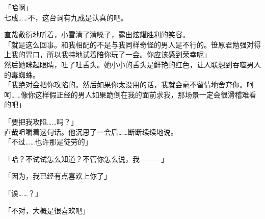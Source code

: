 「哈啊」\\

七成……不，这台词有九成是认真的吧。

直哉敷衍地听着，小雪清了清嗓子，露出炫耀胜利的笑容。\\

「就是这么回事。和我相配的不是与我同样奇怪的男人是不行的。笹原君勉强对得上我的胃口，所以我特地试着陪你玩了一会。你应该感到荣幸呢」\\

然后她眯起眼睛，吐了吐舌头。她小小的舌头是鲜艳的红色，让人联想到吞噬男人的毒蜘蛛。\\

「我绝对会把你攻陷的。然后如果你太没用的话，我就会毫不留情地舍弃你。呵呵……像你这样假正经的男人如果跪倒在我的面前求我，那场景一定会很滑稽难看的吧」

「要把我攻陷……吗？」\\

直哉咀嚼着这句话。他沉思了一会后……断断续续地说。\\

「不过……也许那是徒劳的」

「哈？不试试怎么知道？不管你怎么说，我———」

「因为，我已经有点喜欢上你了」

「诶……？」

「不对，大概是很喜欢吧」

